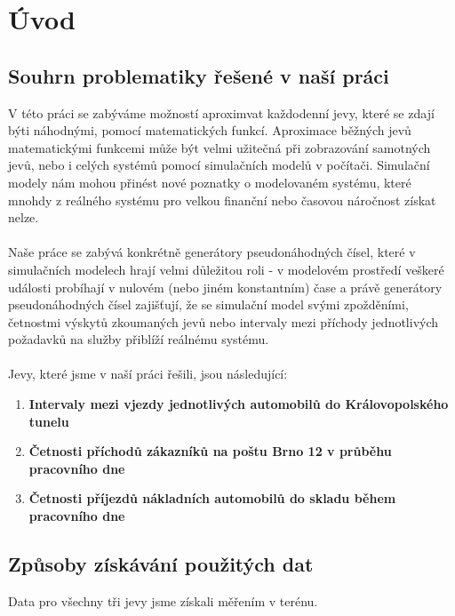 \documentclass[11pt,a4paper]{article}
\begin{document}

\clearpage

\tableofcontents
\clearpage

\section{Úvod}
	\subsection{Souhrn problematiky řešené v naší práci}
	V této práci se zabýváme možností aproximvat každodenní jevy, které se zdají býti náhodnými,
	pomocí matematických funkcí. Aproximace běžných jevů matematickými funkcemi může být velmi 
	užitečná při zobrazování samotných jevů, nebo i celých systémů pomocí simulačních modelů v
	počítači. Simulační modely nám mohou přinést nové poznatky o modelovaném systému, které 
	mnohdy z reálného systému pro velkou finanční nebo časovou náročnost získat nelze. \\ \\

	Naše práce se zabývá konkrétně generátory pseudonáhodných čísel, které v simulačních 
	modelech hrají velmi důležitou roli - v modelovém prostředí veškeré události probíhají v 
	nulovém (nebo jiném konstantním) čase a právě generátory pseudonáhodných čísel zajišťují,
	že se simulační model svými zpožděními, četnostmi výskytů zkoumaných jevů nebo intervaly mezi
	příchody jednotlivých požadavků na služby přiblíží reálnému systému. \\ \\

	Jevy, které jsme v naší práci řešili, jsou následující:
	\begin{enumerate}
		\item{\textbf{Intervaly mezi vjezdy jednotlivých automobilů do Královopolského tunelu}}
		\item{\textbf{Četnosti příchodů zákazníků na poštu Brno 12 v průběhu pracovního dne}}
		\item{\textbf{Četnosti příjezdů nákladních automobilů do skladu během pracovního dne}}
	\end{enumerate}

	\subsection{Způsoby získávání použitých dat}
	Data pro všechny tři jevy jsme získali měřením v terénu. \\ \\
\end{document}
